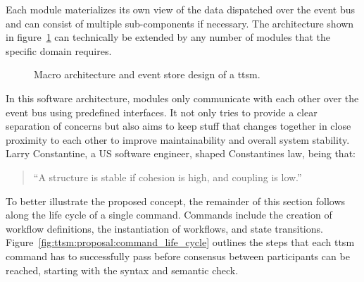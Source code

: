 Each module materializes its own view of the data dispatched over the event bus and can consist of multiple sub-components if necessary. The architecture shown in figure~\ref{fig:ttsm:proposal:macro_architecture} can technically be extended by any number of modules that the specific domain requires.

\begin{figure}[h]
    \caption{Macro architecture and event store design of a \gls{ttsm}.}
    \label{fig:ttsm:proposal:macro_architecture}
\end{figure}

In this software architecture, modules only communicate with each other over the event bus using predefined interfaces. It not only tries to provide a clear separation of concerns but also aims to keep stuff that changes together in close proximity to each other to improve maintainability and overall system stability. Larry Constantine, a US software engineer, shaped Constantines law, being that:

\begin{quote}
    ``A structure is stable if cohesion is high, and coupling is low.''~\cite[p.~16]{newman2019_monolith_to_microservices_constantines_law}
\end{quote}

To better illustrate the proposed concept, the remainder of this section follows along the life cycle of a single command. Commands include the creation of workflow definitions, the instantiation of workflows, and state transitions. Figure~\ref{fig:ttsm:proposal:command_life_cycle} outlines the steps that each \gls{ttsm} command has to successfully pass before consensus between participants can be reached, starting with the syntax and semantic check.


